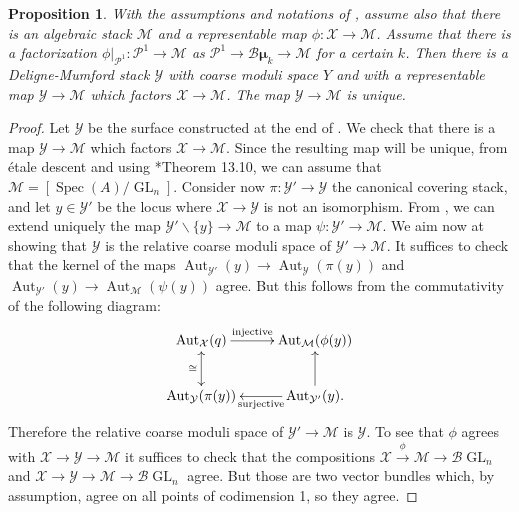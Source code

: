 \documentclass{amsart}
\newcommand{\cB}{\mathcal{B}}
\newcommand{\cM}{\mathcal{M}}
\newcommand{\cP}{\mathcal{P}}
\newcommand{\cX}{\mathcal{X}}
\newcommand{\cY}{\mathcal{Y}}
\newcommand{\spec}{\operatorname{Spec}}
\newcommand{\GL}{\operatorname{GL}}
\newcommand{\bmu}{\bm{\mu}}
\newtheorem{Prop}[theorem]{Proposition}
\theoremstyle{definition}
\begin{document}
\begin{Prop}\label{prop artin contraction theorems for stacks}
With the assumptions and notations of , assume also that there is an algebraic stack $\cM$ and a representable map $\phi: \cX\to \cM$. Assume that there is a factorization $\phi|_{\cP^1}:\cP^1 \to \cM$ as $\cP^1 \to \cB\bmu_k \to \cM$ for a certain $k$.  Then there is a Deligne-Mumford stack $\cY$ with coarse moduli space $Y$ and with a representable map $\cY\to \cM$ which factors $\cX\to \cM$. The map $\cY\to \cM$ is unique.
\end{Prop}
\begin{proof}
Let $\cY$ be the surface constructed at the end of . We check that there is a map $\cY\to \cM$ which factors $\cX\to \cM$. Since the resulting map will be unique, from \'etale descent and using \cite{luna}*{Theorem 13.10}, we can assume that $\cM = [\spec(A)/\GL_n]$. 
Consider now $\pi:\cY'\to \cY$ the canonical covering stack, and let $y\in \cY'$ be the locus where $\cX\to \cY$ is not an isomorphism. From , we can extend uniquely the map $\cY'\smallsetminus \{y\}\to \cM$ to a map $\psi:\cY'\to \cM$. We aim now at showing that $\cY$ is the relative coarse moduli space of $\cY'\to \cM$. It suffices to check that the kernel of the maps $\operatorname{Aut}_{\cY'}(y)\to \operatorname{Aut}_{\cY}(\pi(y))$ and  $\operatorname{Aut}_{\cY'}(y)\to \operatorname{Aut}_{\cM}(\psi(y))$ agree. But
this follows from the commutativity of the following diagram:
$$\xymatrix{\operatorname{Aut}_{\cX}(q) \ar@{<->}[d]_\cong \ar[r]^-{\text{injective}} & \operatorname{Aut}_{\cM}(\phi(y)) \\ \operatorname{Aut}_{\cY}(\pi(y)) & \operatorname{Aut}_{\cY'}(y). \ar[l]^-{\text{surjective}} \ar[u]}$$
Therefore the relative coarse moduli space of $\cY'\to \cM$ is $\cY$. To see that $\phi$ agrees with  $\cX\to \cY\to \cM$ it suffices to check that the compositions $\cX \xrightarrow{\phi}\cM\to \cB\GL_n$ and $\cX\to \cY\to \cM \to \cB\GL_n$ agree.  But those are two vector bundles which, by assumption, agree on all points of codimension 1, so they agree.
\end{proof}
\end{document}
